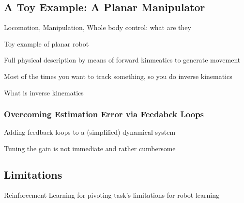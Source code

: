 \subsection{A Toy Example: A Planar Manipulator}
Locomotion, Manipulation, Whole body control: what are they

Toy example of planar robot

Full physical description by means of forward kinmeatics to generate movement

Most of the times you want to track something, so you do inverse kinematics

What is inverse kinematics

\subsubsection{Overcoming Estimation Error via Feedabck Loops}

Adding feedback loops to a (simplified) dynamical system

Tuning the gain is not immediate and rather cumbersome

\subsection{Limitations}

Reinforcement Learning for pivoting task's limitations for robot learning